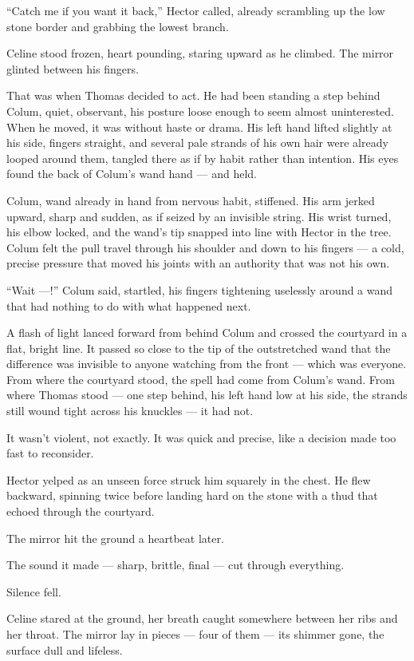 \enquote{Catch me if you want it back,} Hector called, already scrambling up the low stone border and grabbing the lowest branch.
 
Celine stood frozen, heart pounding, staring upward as he climbed. The mirror glinted between his fingers.

That was when Thomas decided to act. He had been standing a step behind Colum, quiet, observant, his posture loose enough to seem almost uninterested. When he moved, it was without haste or drama. His left hand lifted slightly at his side, fingers straight, and several pale strands of his own hair were already looped around them, tangled there as if by habit rather than intention. His eyes found the back of Colum's wand hand --- and held.

Colum, wand already in hand from nervous habit, stiffened. His arm jerked upward, sharp and sudden, as if seized by an invisible string. His wrist turned, his elbow locked, and the wand's tip snapped into line with Hector in the tree. Colum felt the pull travel through his shoulder and down to his fingers --- a cold, precise pressure that moved his joints with an authority that was not his own.

\enquote{Wait ---!} Colum said, startled, his fingers tightening uselessly around a wand that had nothing to do with what happened next.

A flash of light lanced forward from behind Colum and crossed the courtyard in a flat, bright line. It passed so close to the tip of the outstretched wand that the difference was invisible to anyone watching from the front --- which was everyone. From where the courtyard stood, the spell had come from Colum's wand. From where Thomas stood --- one step behind, his left hand low at his side, the strands still wound tight across his knuckles --- it had not.
  
It wasn't violent, not exactly. It was quick and precise, like a decision made too fast to reconsider.
 
Hector yelped as an unseen force struck him squarely in the chest. He flew backward, spinning twice before landing hard on the stone with a thud that echoed through the courtyard.
 
The mirror hit the ground a heartbeat later.
 
The sound it made --- sharp, brittle, final --- cut through everything.
 
Silence fell.
 
Celine stared at the ground, her breath caught somewhere between her ribs and her throat. The mirror lay in pieces --- four of them --- its shimmer gone, the surface dull and lifeless.
 
